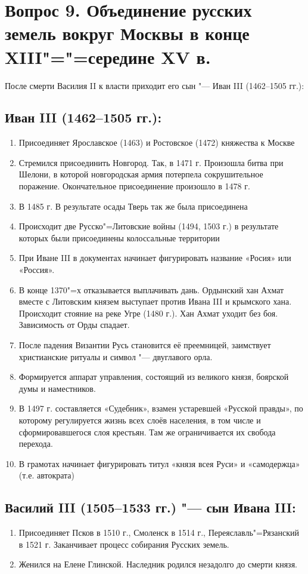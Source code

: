 \section{Вопрос 9. Объединение русских земель вокруг Москвы в конце XIII"="=середине XV в.}

После смерти Василия II к власти приходит его сын "--- Иван III (1462--1505 гг.):

\subsection{Иван III (1462--1505 гг.):}

\begin{enumerate}
    \item{ Присоединяет Ярославское (1463) и Ростовское (1472) княжества к Москве }
    \item{ Стремился присоединить Новгород. Так, в 1471 г. Произошла битва при Шелони, в которой новгородская армия потерпела сокрушительное поражение. Окончательное присоединение произошло в 1478 г. }
    \item{ В 1485 г. В результате осады Тверь так же была присоединена }
    \item{ Происходит две Русско"=Литовские войны (1494, 1503 г.) в результате которых были присоединены колоссальные территории }
    \item{ При Иване III в документах начинает фигурировать название «Росия» или «Россия». }
    \item{ В конце 1370"=х отказывается выплачивать дань. Ордынский хан Ахмат вместе с Литовским князем выступает против Ивана III и крымского хана. Происходит стояние на реке Угре (1480 г.). Хан Ахмат уходит без боя. Зависимость от Орды спадает. }
    \item{ После падения Византии Русь становится её преемницей, заимствует христианские ритуалы и символ "--- двуглавого орла. }
    \item{ Формируется аппарат управления, состоящий из великого князя, боярской думы и наместников. }
    \item{ В 1497 г. составляется «Судебник», взамен устаревшей «Русской правды», по которому регулируется жизнь всех слоёв населения, в том числе и сформировавшегося слоя крестьян. Там же ограничивается их свобода перехода. }
    \item{ В грамотах начинает фигурировать титул «князя всея Руси» и «самодержца» (т.е. автократа) }
\end{enumerate}

\subsection{Василий III (1505--1533 гг.) "--- сын Ивана III:}

\begin{enumerate}
    \item{ Присоединяет Псков в 1510 г., Смоленск в 1514 г., Переяславль"=Рязанский в 1521 г. Заканчивает процесс собирания Русских земель. }
    \item{ Женился на Елене Глинской. Наследник родился незадолго до смерти князя. }
\end{enumerate}

